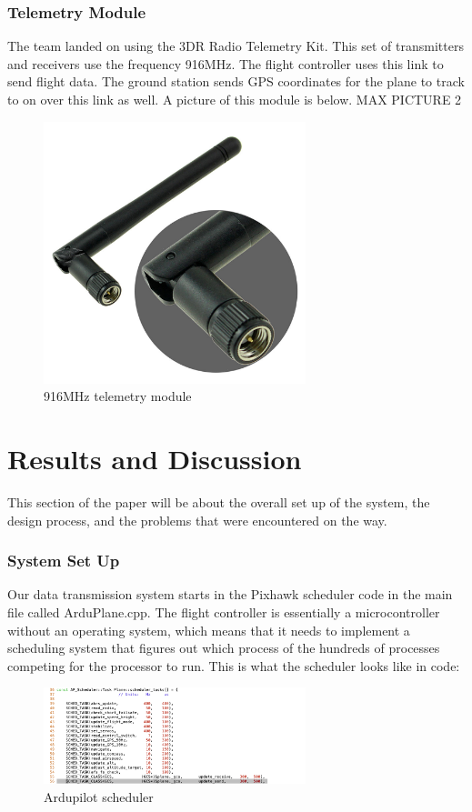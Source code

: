 \documentclass[12pt,journal,compsoc]{IEEEtran}
\begin{document}
\subsubsection{Telemetry Module}
The team landed on using the 3DR Radio Telemetry Kit. This set of transmitters and receivers use the frequency 916MHz. The flight controller uses this link to send flight data. The ground station sends GPS coordinates for the plane to track to on over this link as well. A picture of this module is below.
 MAX PICTURE 2
\begin{figure}[h!]
\hspace*{0cm}
\centering
\includegraphics[width=3in]{telemmodule.jpg}
\caption{916MHz telemetry module}
\label{mavStruct}
\end{figure}

\section{Results and Discussion}
This section of the paper will be about the overall set up of the system, the design process, and the problems that were encountered on the way.
\subsubsection{System Set Up}
Our data transmission system starts in the Pixhawk scheduler code in the main file called ArduPlane.cpp. The flight controller is essentially a microcontroller without an operating system, which means that it needs to implement a scheduling system that figures out which process of the hundreds of processes competing for the processor to run. This is what the scheduler looks like in code:
\begin{figure}[h!]
\hspace*{0cm}
\centering
\includegraphics[width=3in]{Scheduler.png}
\caption{Ardupilot scheduler}
\label{mavSched}
\end{figure}
\end{document}
